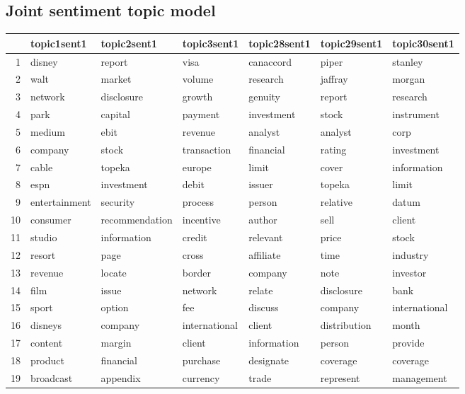 \subsection{Joint sentiment topic model}

\begin{table}[ht]
\centering
\begin{tabular}{rllllll}
  \hline
 & topic1sent1 & topic2sent1 & topic3sent1 & topic28sent1 & topic29sent1 & topic30sent1 \\ 
  \hline
1 & disney & report & visa & canaccord & piper & stanley \\ 
  2 & walt & market & volume & research & jaffray & morgan \\ 
  3 & network & disclosure & growth & genuity & report & research \\ 
  4 & park & capital & payment & investment & stock & instrument \\ 
  5 & medium & ebit & revenue & analyst & analyst & corp \\ 
  6 & company & stock & transaction & financial & rating & investment \\ 
  7 & cable & topeka & europe & limit & cover & information \\ 
  8 & espn & investment & debit & issuer & topeka & limit \\ 
  9 & entertainment & security & process & person & relative & datum \\ 
  10 & consumer & recommendation & incentive & author & sell & client \\ 
  11 & studio & information & credit & relevant & price & stock \\ 
  12 & resort & page & cross & affiliate & time & industry \\ 
  13 & revenue & locate & border & company & note & investor \\ 
  14 & film & issue & network & relate & disclosure & bank \\ 
  15 & sport & option & fee & discuss & company & international \\ 
  16 & disneys & company & international & client & distribution & month \\ 
  17 & content & margin & client & information & person & provide \\ 
  18 & product & financial & purchase & designate & coverage & coverage \\ 
  19 & broadcast & appendix & currency & trade & represent & management \\ 

\end{tabular}
\end{table}
